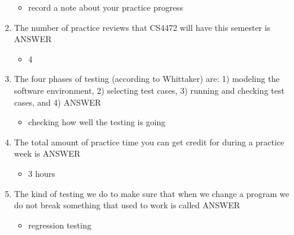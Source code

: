 \documentclass{exam}
\begin{document}
\begin{enumerate}
\begin{itemize}
\item record a note about your practice progress
\end{itemize}
\item The number of practice reviews that CS4472 will have this semester is ANSWER
\begin{itemize}
\item 4
\end{itemize}
\item The four phases of testing (according to Whittaker) are: 1) modeling the software environment, 2) selecting test cases, 3) running and checking test cases, and 4) ANSWER
\begin{itemize}
\item checking how well the testing is going
\end{itemize}
\item The total amount of practice time you can get credit for during a practice week is ANSWER
\begin{itemize}
\item 3 hours
\end{itemize}
\item The kind of testing we do to make sure that when we change a program we do not break something that used to work is called ANSWER
\begin{itemize}
\item regression testing
\end{itemize}
\end{enumerate}
\end{document}
